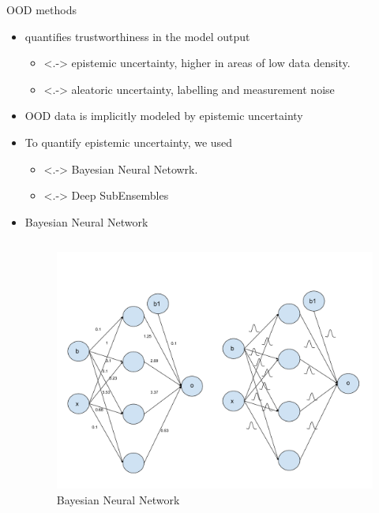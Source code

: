 \documentclass[10pt, aspectratio=169]{beamer}
\begin{document}
\begin{frame}[allowframebreaks]{OOD methods}
\begin{itemize}
            \begin{itemize}
                \item quantifies trustworthiness in the model output
                \begin{itemize}
                        \item<.-> epistemic uncertainty, higher in areas of low data density.
                        \item<.-> aleatoric uncertainty, labelling and measurement noise
                \end{itemize}
                \item OOD data is implicitly modeled by epistemic uncertainty
                \item To quantify epistemic uncertainty, we used
                \begin{itemize}
                    \item<.-> Bayesian Neural Netowrk.
                    \item<.-> Deep SubEnsembles
                \end{itemize}
            \end{itemize}
            \pagebreak
        \begin{itemize}
            \item Bayesian Neural Network
            \begin{columns}
                   \begin{figure}
                        \centering
                        \includegraphics[scale=0.275]{images/BNN.pdf}
                        \caption{Bayesian Neural Network}
                   \end{figure}
                   

\end{columns}
\end{itemize}
\end{itemize}
\end{frame}
\end{document}
